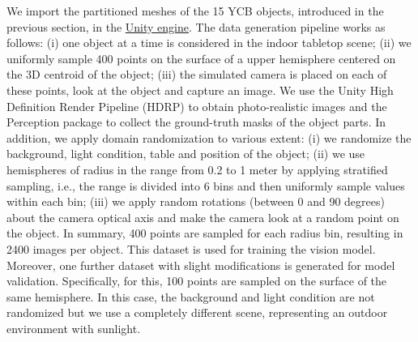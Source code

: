 We import the partitioned meshes of the 15 YCB objects, introduced in the previous section, in the \href{https://unity.com/}{Unity engine}. The data generation pipeline works as follows: (i) one object at a time is considered in the indoor tabletop scene; (ii) we uniformly sample 400 points on the surface of a upper hemisphere centered on the 3D centroid of the object; (iii) the simulated camera is placed on each of these points, look at the object and capture an image. We use the Unity High Definition Render Pipeline (HDRP) to obtain photo-realistic images and the Perception package to collect the ground-truth masks of the object parts. In addition, we apply domain randomization to various extent: (i) we randomize the background, light condition, table and position of the object; (ii) we use hemispheres of radius in the range from 0.2 to 1 meter by applying stratified sampling, i.e., the range is divided into 6 bins and then uniformly sample values within each bin; (iii) we apply random rotations (between 0 and 90 degrees) about the camera optical axis and make the camera look at a random point on the object. In summary, 400 points are sampled for each radius bin, resulting in 2400 images per object. This dataset is used for training the vision model. Moreover, one further dataset with slight modifications is generated for model validation. Specifically, for this, 100 points are sampled on the surface of the same hemisphere. In this case, the background and light condition are not randomized but we use a completely different scene, representing an outdoor environment with sunlight.


